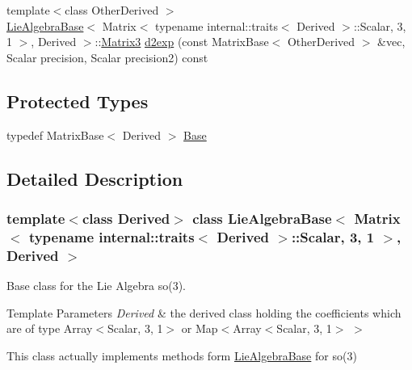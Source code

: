\begin{DoxyCompactItemize}
\item 
{\footnotesize template$<$class Other\+Derived $>$ }\\\hyperlink{class_lie_algebra_base}{Lie\+Algebra\+Base}$<$ Matrix$<$ typename internal\+::traits$<$ Derived $>$\+::Scalar, 3, 1 $>$, Derived $>$\+::\hyperlink{class_lie_algebra_base_3_01_matrix_3_01typename_01internal_1_1traits_3_01_derived_01_4_1_1_scalabfa0bdce6d9781ee940346c3f6d91f4e_a76b0bda7b6a5390a434df96474c582db}{Matrix3} \hyperlink{class_lie_algebra_base_3_01_matrix_3_01typename_01internal_1_1traits_3_01_derived_01_4_1_1_scalabfa0bdce6d9781ee940346c3f6d91f4e_a8fec2455fc2fca1f7d4683b1f78d67ec}{d2exp} (const Matrix\+Base$<$ Other\+Derived $>$ \&vec, Scalar precision, Scalar precision2) const
\end{DoxyCompactItemize}
\subsection*{Protected Types}
\begin{DoxyCompactItemize}
\item 
typedef Matrix\+Base$<$ Derived $>$ \hyperlink{class_lie_algebra_base_3_01_matrix_3_01typename_01internal_1_1traits_3_01_derived_01_4_1_1_scalabfa0bdce6d9781ee940346c3f6d91f4e_a732476e0ccd5638bf791f9f7a4c59f26}{Base}
\end{DoxyCompactItemize}


\subsection{Detailed Description}
\subsubsection*{template$<$class Derived$>$\newline
class Lie\+Algebra\+Base$<$ Matrix$<$ typename internal\+::traits$<$ Derived $>$\+::\+Scalar, 3, 1 $>$, Derived $>$}

Base class for the Lie Algebra so(3). 


\begin{DoxyTemplParams}{Template Parameters}
{\em Derived} & the derived class holding the coefficients which are of type Array$<$\+Scalar, 3, 1$>$ or Map$<$Array$<$\+Scalar, 3, 1$>$ $>$\\
\hline
\end{DoxyTemplParams}
This class actually implements methods form \hyperlink{class_lie_algebra_base}{Lie\+Algebra\+Base} for so(3)

